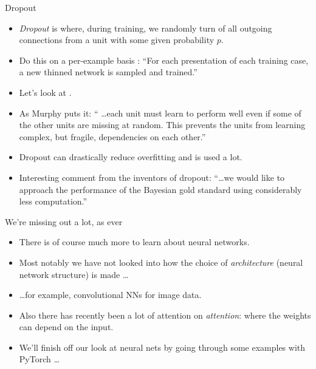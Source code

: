 \documentclass[10pt]{beamer}
\begin{document}
\begin{titledslide}{Dropout}

  \begin{itemize}
  \item \emph{Dropout} is where, during training, we randomly turn of
    all outgoing connections from a unit with some given probability
    $p$.
  \item Do this on a per-example basis : ``For each presentation of each training case, a new thinned network is sampled and
trained.'' \cite{JMLR:v15:srivastava14a}
  \item Let's look at \cite[Fig~13.18]{pml1Book}.
  \item As Murphy puts it: `` \dots each unit must learn to perform well even
    if some of the other units are missing at random. This prevents
    the units from learning complex, but fragile, dependencies on each
    other.''
  \item Dropout can drastically reduce overfitting and is used a lot.
  \item Interesting comment from the inventors of dropout: ``\dots we would like to approach the performance of the
    Bayesian gold standard using considerably less computation.'' \cite{JMLR:v15:srivastava14a} 
  \end{itemize}
  
\end{titledslide}
\begin{titledslide}{We're missing out a lot, as ever}

  \begin{itemize}
  \item There is of course much more to learn about neural networks.
  \item Most notably we have not looked into how the choice of
    \emph{architecture} (neural network structure) is made \dots
  \item \dots for example, convolutional NNs for image data.
  \item Also there has recently been a lot of attention on
    \emph{attention}: where the weights can depend on the input.
  \item We'll finish off our look at neural nets by going through some
    examples with PyTorch \dots
  \end{itemize}
  
\end{titledslide}
\end{document}
